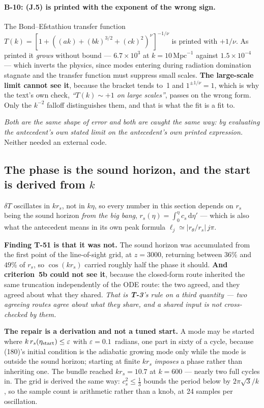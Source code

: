 \paragraph{B-10: (J.5) is printed with the exponent of the wrong sign.} The
Bond--Efstathiou transfer function
$T(k)=[1+((ak)+(bk)^{3/2}+(ck)^2)^\nu]^{-1/\nu}$ is printed with $+1/\nu$. As
printed it \emph{grows} without bound --- $6.7\times10^3$ at
$k=10\,\mathrm{Mpc}^{-1}$ against $1.5\times10^{-4}$ --- which inverts the
physics, since modes entering during radiation domination stagnate and the
transfer function must suppress small scales. \textbf{The large-scale limit
cannot see it}, because the bracket tends to~1 and $1^{\pm1/\nu}=1$, which is
why the text's own check, \emph{``$T(k)\sim+1$ on large scales''}, passes on the
wrong form. Only the $k^{-2}$ falloff distinguishes them, and that is what the
fit is a fit to.

\emph{Both are the same shape of error and both are caught the same way: by
evaluating the antecedent's own stated limit on the antecedent's own printed
expression.} Neither needed an external code.

\subsection{The phase is the sound horizon, and the start is derived from $k$}

$\delta T$ oscillates in $kr_s$, not in $k\eta$, so every number in this
section depends on $r_s$ being the sound horizon \emph{from the big bang},
$r_s(\eta)=\int_0^\eta c_s\,\mathrm d\eta'$ --- which is also what the
antecedent means in its own peak formula $\ell_j\simeq|r_\theta/r_s|\,j\pi$.

\textbf{Finding T-51 is that it was not.} The sound horizon was accumulated
from the first point of the line-of-sight grid, at $z=3000$, returning between
$36\%$ and $49\%$ of $r_s$, so $\cos(kr_s)$ carried roughly half the phase it
should. \textbf{And criterion~5b could not see it}, because the closed-form
route inherited the same truncation independently of the ODE route: the two
agreed, and they agreed about what they shared. \emph{That is \textbf{T-3}'s
rule on a third quantity --- two agreeing routes agree about what they share,
and a shared input is not cross-checked by them.}

\textbf{The repair is a derivation and not a tuned start.} A mode may be
started where $k\,r_s(\eta_{\rm start})\le\varepsilon$ with
$\varepsilon=0.1$~radians, one part in sixty of a cycle, because (180)'s
initial condition is the adiabatic growing mode only while the mode is outside
the sound horizon; starting at finite $kr_s$ \emph{imposes} a phase rather than
inheriting one. The bundle reached $kr_s=10.7$ at $k=600$ --- nearly two full
cycles in. The grid is derived the same way: $c_s^2\le\tfrac13$ bounds the
period below by $2\pi\sqrt3/k$, so the sample count is arithmetic rather than a
knob, at 24 samples per oscillation.

